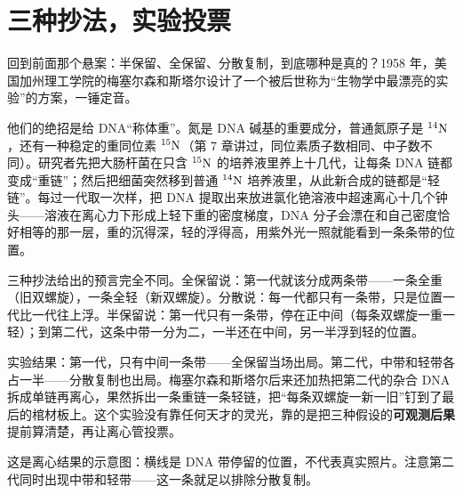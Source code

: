 \section{三种抄法，实验投票}

\begin{zhengju}
回到前面那个悬案：半保留、全保留、分散复制，到底哪种是真的？1958 年，美国加州理工学院的梅塞尔森和斯塔尔设计了一个被后世称为“生物学中最漂亮的实验”的方案，一锤定音。

他们的绝招是给 DNA“称体重”。氮是 DNA 碱基的重要成分，普通氮原子是 $\mathrm{^{14}N}$，还有一种稳定的重同位素 $\mathrm{^{15}N}$（第 7 章讲过，同位素质子数相同、中子数不同）。研究者先把大肠杆菌在只含 $\mathrm{^{15}N}$ 的培养液里养上十几代，让每条 DNA 链都变成“重链”；然后把细菌突然移到普通 $\mathrm{^{14}N}$ 培养液里，从此新合成的链都是“轻链”。每过一代取一次样，把 DNA 提取出来放进氯化铯溶液中超速离心十几个钟头——溶液在离心力下形成上轻下重的密度梯度，DNA 分子会漂在和自己密度恰好相等的那一层，重的沉得深，轻的浮得高，用紫外光一照就能看到一条条带的位置。

三种抄法给出的预言完全不同。全保留说：第一代就该分成两条带——一条全重（旧双螺旋），一条全轻（新双螺旋）。分散说：每一代都只有一条带，只是位置一代比一代往上浮。半保留说：第一代只有一条带，停在正中间（每条双螺旋一重一轻）；到第二代，这条中带一分为二，一半还在中间，另一半浮到轻的位置。

实验结果：第一代，只有中间一条带——全保留当场出局。第二代，中带和轻带各占一半——分散复制也出局。梅塞尔森和斯塔尔后来还加热把第二代的杂合 DNA 拆成单链再离心，果然拆出一条重链一条轻链，把“每条双螺旋一新一旧”钉到了最后的棺材板上。这个实验没有靠任何天才的灵光，靠的是把三种假设的\textbf{可观测后果}提前算清楚，再让离心管投票。
\end{zhengju}


这是离心结果的示意图：横线是 DNA 带停留的位置，不代表真实照片。注意第二代同时出现中带和轻带——这一条就足以排除分散复制。

